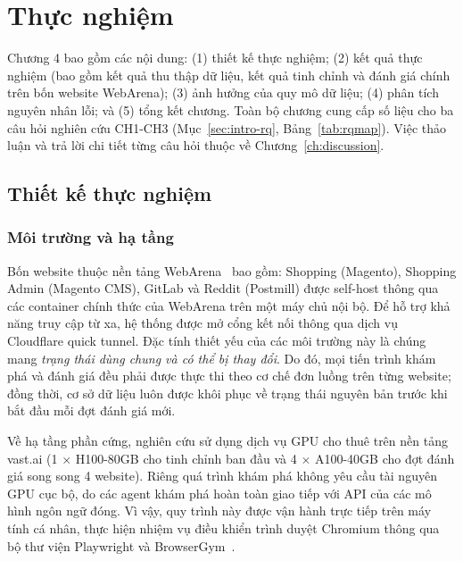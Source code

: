 
\chapter{Thực nghiệm}
\label{ch:experiments}

Chương 4 bao gồm các nội dung: (1) thiết kế thực nghiệm; (2) kết quả thực nghiệm (bao gồm kết quả thu thập dữ liệu, kết quả tinh chỉnh và đánh giá chính trên bốn website WebArena); (3) ảnh hưởng của quy mô dữ liệu; (4) phân tích nguyên nhân lỗi; và (5) tổng kết chương. Toàn bộ chương cung cấp số liệu cho ba câu hỏi nghiên cứu CH1-CH3 (Mục~\ref{sec:intro-rq}, Bảng~\ref{tab:rqmap}). Việc thảo luận và trả lời chi tiết từng câu hỏi thuộc về Chương~\ref{ch:discussion}.

\section{Thiết kế thực nghiệm}
\label{sec:exp-setup}

\subsection{Môi trường và hạ tầng}
Bốn website thuộc nền tảng WebArena~\cite{zhou2024webarena} bao gồm: Shopping (Magento), Shopping Admin (Magento CMS), GitLab và Reddit (Postmill) được self-host thông qua các container chính thức của WebArena trên một máy chủ nội bộ. Để hỗ trợ khả năng truy cập từ xa, hệ thống được mở cổng kết nối thông qua dịch vụ Cloudflare quick tunnel. Đặc tính thiết yếu của các môi trường này là chúng mang \emph{trạng thái dùng chung và có thể bị thay đổi}. Do đó, mọi tiến trình khám phá và đánh giá đều phải được thực thi theo cơ chế đơn luồng trên từng website; đồng thời, cơ sở dữ liệu luôn được khôi phục về trạng thái nguyên bản trước khi bắt đầu mỗi đợt đánh giá mới.

Về hạ tầng phần cứng, nghiên cứu sử dụng dịch vụ GPU cho thuê trên nền tảng vast.ai (1 $\times$ H100-80GB cho tinh chỉnh ban đầu và 4 $\times$ A100-40GB cho đợt đánh giá song song 4 website). Riêng quá trình khám phá không yêu cầu tài nguyên GPU cục bộ, do các agent khám phá hoàn toàn giao tiếp với API của các mô hình ngôn ngữ đóng. Vì vậy, quy trình này được vận hành trực tiếp trên máy tính cá nhân, thực hiện nhiệm vụ điều khiển trình duyệt Chromium thông qua bộ thư viện Playwright và BrowserGym~\cite{dechezelles2025browsergym}.

